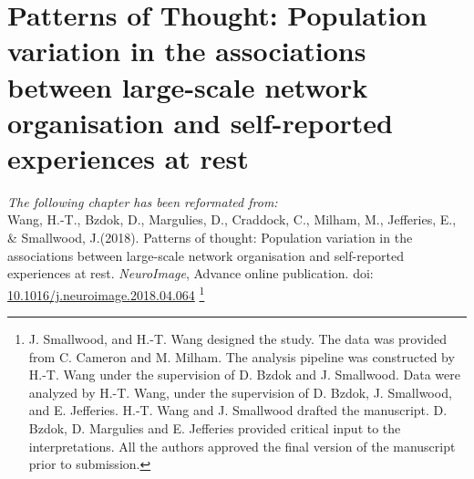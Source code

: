 \chapter{Patterns of Thought: Population variation in the associations between large-scale network organisation and self-reported experiences at rest}
\label{ch:study2}

\textit{The following chapter has been reformated from:\\}
Wang, H.-T., Bzdok, D., Margulies, D., Craddock, C., Milham, M., Jefferies, E., \& Smallwood, J.(2018). 
Patterns of thought: Population variation in the associations between large-scale network organisation and self-reported experiences at rest. 
\textit{NeuroImage}, Advance online publication. doi: \url{10.1016/j.neuroimage.2018.04.064}
\footnote{
J. Smallwood, and H.-T. Wang designed the study. The data was provided from C. Cameron and M. Milham. The analysis pipeline was constructed by H.-T. Wang under the supervision of D. Bzdok and J. Smallwood. Data were analyzed by H.-T. Wang, under the supervision of D. Bzdok, J. Smallwood, and E. Jefferies. H.-T. Wang and J. Smallwood drafted the manuscript. D. Bzdok, D. Margulies and E. Jefferies provided critical input to the interpretations. All the authors approved the final version of the manuscript prior to submission.}
\\


\newpage

